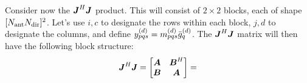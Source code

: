 \documentclass[useAMS,usenatbib]{mn2e}
\makeatletter
\newcommand{\mat}[1]{{\bmath{#1}}}
\newcommand{\JJ}{\mat{J}} %
\newcommand{\JHJ}{\JJ^H\JJ} %
\newcommand{\Matrix}[2]{\left [ \begin{array}{@{}#1@{}}#2\end{array} \right ]}
\newcommand{\AUG}[1]{\bmath{\breve{#1}}}
\newcommand{\Gg}{\AUG{g}}
\newcommand{\Rr}{\AUG{r}}
\newcommand{\Vv}{\AUG{v}}
\newcommand{\LEFT}{\mathrm{L}}
\numberwithin{equation}{section}
\makeatother
\begin{document}
Consider now the $\JHJ$ product. This will consist of $2\times2$ blocks, each of shape 
$[N_\mathrm{ant}N_\mathrm{dir}]^2$. Let's use $i,c$ to designate the rows within each block, $j,d$ to designate the columns, 
and define $y^{(d)}_{pqs}=m^{(d)}_{pqs}\bar{g}^{(d)}_q$. The $\JHJ$ matrix will then have the following block 
structure:
\begin{equation}
\JHJ = \Matrix{cc}{\bmath{A}&\bmath{B}^H\\\bmath{B}&\bmath{A}}
= %
\end{equation}%

\end{document}
